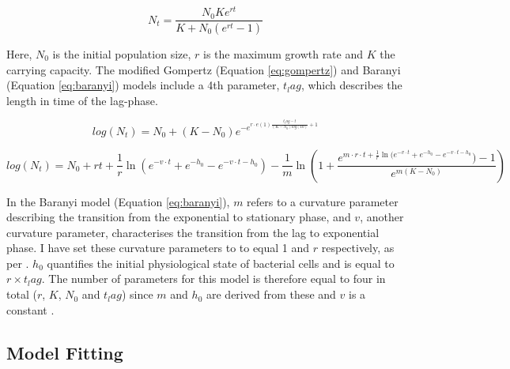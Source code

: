 \documentclass[11pt]{article}
\begin{document}
\begin{linenumbers}
            \begin{equation}
                N_t = \frac{N_0 K e^{rt}}{K + N_0 (e^{rt} - 1)}
                \label{eq:logistic}
            \end{equation}
            
            Here, $N_0$ is the initial population size, $r$ is the maximum growth rate and $K$ the carrying capacity. The modified Gompertz (Equation \ref{eq:gompertz}) and Baranyi (Equation \ref{eq:baranyi}) models include a 4th parameter, $t_lag$, which describes the length in time of the lag-phase.
            
            \begin{equation}
                log(N_t) = N_0 + (K - N_0) e^{-e^{r \cdot e(1) \frac{t_lag - t}{(K - N_0) log(10)}+1}}
                \label{eq:gompertz}
            \end{equation}
            
            \begin{equation}
                log(N_t) = N_0 + r t + \frac{1}{r} \ln(e^{-v \cdot t} + e^{-h_0} - e^{-v \cdot t -h_0}) - \frac{1}{m} \ln(1 + \frac{e^{m \cdot r \cdot t + \frac{1}{r} \ln(e^{-v \cdot t} + e^{-h_0} - e^{-v \cdot t -h_0}}) - 1}{e^{m(K - N_0)}})
                \label{eq:baranyi}
            \end{equation}
            
            In the Baranyi model (Equation \ref{eq:baranyi}), $m$ refers to a curvature parameter describing the transition from the exponential to stationary phase, and $v$, another curvature parameter, characterises the transition from the lag to exponential phase. I have set these curvature parameters to to equal 1 and $r$ respectively, as per \cite{baranyi_simple_1997}. $h_0$ quantifies the initial physiological state of bacterial cells and is equal to $r \times t_lag$. The number of parameters for this model is therefore equal to four in total ($r$, $K$, $N_0$ and $t_lag$) since $m$ and $h_0$ are derived from these and $v$ is a constant \citep{grijspeerdt_estimating_1999}. 


        \subsection{Model Fitting}
        

\end{linenumbers}
\end{document}
